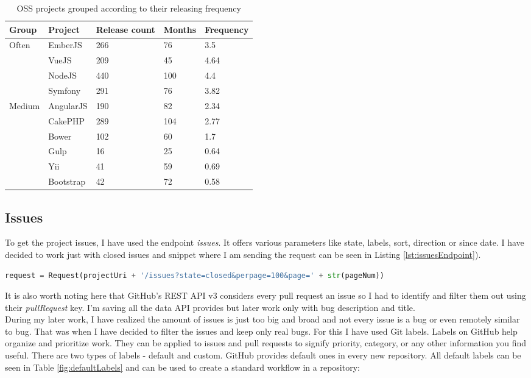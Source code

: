 \begin{table}[H]
\centering
\begin{tabular}{| p{2cm}|p{2cm}|p{2.8cm}|p{1.8cm}|p{2cm}|}
 \hline
\textbf{Group} & \textbf{ Project }& \textbf{Release count} & \textbf{ Months }& \textbf{Frequency}\\
 \hline
  \multirow{4}{*}{Often}   & EmberJS & 266   & 76 & 3.5\\ 
    & VueJS &  209 & 45 & 4.64 \\ 
    & NodeJS & 440 & 100 & 4.4\\  
    & Symfony & 291 & 76 & 3.82\\ \hline 
  \multirow{4}{*}{Medium}   & AngularJS & 190   & 82 & 2.34\\ 
    & CakePHP & 289 & 104 & 2.77\\ 
    & Bower &  102 & 60 & 1.7\\   \hline 
  \multirow{4}{*}{Seldom}   & Gulp & 16 & 25 & 0.64\\ 
    & Yii & 41 & 59 & 0.69\\ 
    & Bootstrap &  42 & 72 & 0.58\\  \hline 
\end{tabular}
\caption{OSS projects grouped according to their releasing frequency}
\label{table:releaseGroupsCalculation}
\end{table}


\subsection{Issues} \label{ssec:issuesMining}
To get the project issues, I have used the endpoint \textit{issues}. It offers various parameters like state, labels, sort, direction or since date. I have decided to work just with closed issues and snippet where I am sending the request can be seen in Listing \ref{lst:issuesEndpoint}).

\begin{lstlisting}[caption={Requesting 100 closed issues},label={lst:issuesEndpoint},language=Python]
request = Request(projectUri + '/issues?state=closed&perpage=100&page=' + str(pageNum))
\end{lstlisting}

It is also worth noting here that GitHub's REST API v3 considers every pull request an issue so I had to identify and filter them out using their \textit{pullRequest} key. I'm saving all the data API provides but later work only with bug description and title.\\
During my later work, I have realized the amount of issues is just too big and broad and not every issue is a bug or even remotely similar to bug. That was when I have decided to filter the issues and keep only real bugs. For this I have used Git labels. Labels on GitHub help organize and prioritize work. They can be applied to issues and pull requests to signify priority, category, or any other information you find useful. There are two types of labels - default and custom. GitHub provides default ones in every new repository. All default labels can be seen in Table \ref{fig:defaultLabels} and can be used to create a standard workflow in a repository:

